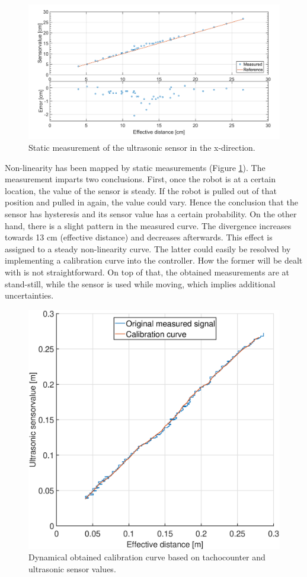 \documentclass{article}
\begin{document}
	\begin{figure}[H]
		\centering
		\includegraphics[keepaspectratio, width=\textwidth]{Figures/UltraSoon_XPos_Cal_Curve.pdf}
		\caption{Static measurement of the ultrasonic sensor in the x-direction.}
		\label{fig:Cal_ultrasonic}
	\end{figure}
	
	\par Non-linearity has been mapped by static measurements (Figure \ref{fig:Cal_ultrasonic}). The measurement imparts two conclusions. First, once the robot is at a certain location, the value of the sensor is steady. If the robot is pulled out of that position and pulled in again, the value could vary. Hence the conclusion that the sensor has hysteresis and its sensor value has a certain probability. On the other hand, there is a slight pattern in the measured curve. The divergence increases towards 13 cm (effective distance) and decreases afterwards. This effect is assigned to a steady non-linearity curve. The latter could easily be resolved by implementing a calibration curve into the controller. How the former will be dealt with is not straightforward. On top of that, the obtained measurements are at stand-still, while the sensor is used while moving, which implies additional uncertainties. 
	
	\begin{figure}[H]
		\centering
		\includegraphics[keepaspectratio, width = 0.6 \textwidth]{Ultrasonic_CalibrationCurve_Dynamical.eps}
		\caption{Dynamical obtained calibration curve based on tachocounter and ultrasonic sensor values.}
		\label{fig:Ultrasoniccalibrationcurvedynamical}
	\end{figure}
	
\end{document}
